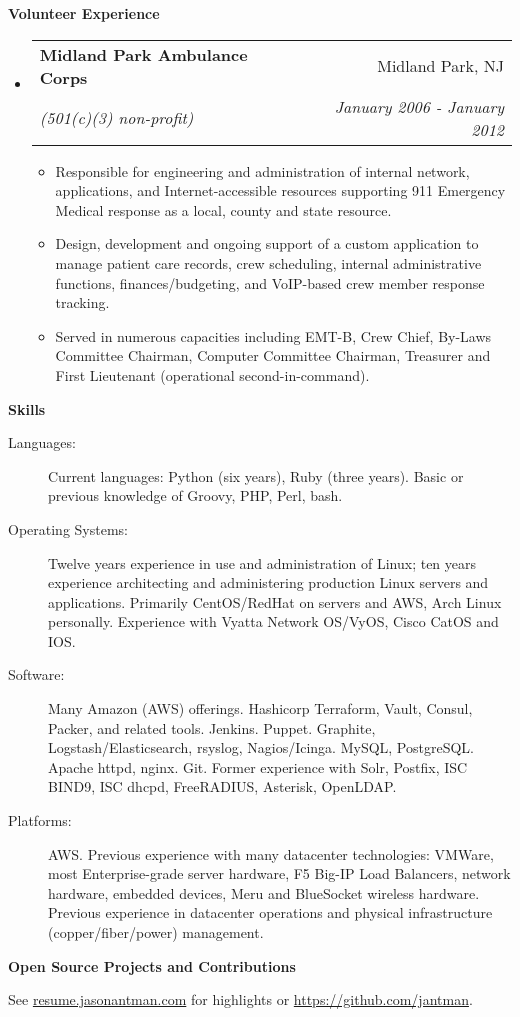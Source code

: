 \documentclass[letterpaper,11pt]{article}
\makeatletter
\newcommand{\resitem}[1]{\item #1 \vspace{-2pt}}
\newcommand{\resheading}[1]{{\large \colorbox{mygrey}{\begin{minipage}{\textwidth}{\textbf{#1 \vphantom{p\^{E}}}}\end{minipage}}}}
\newcommand{\ressubheading}[4]{
\begin{tabular*}{7.0in}{l@{\extracolsep{\fill}}r}
		\textbf{#1} & #2 \\
		\textit{#3} & \textit{#4} \\
\end{tabular*}\vspace{-6pt}}
\makeatother
\begin{document}
\resheading{Volunteer Experience}
\begin{itemize}
\item
        \ressubheading{Midland Park Ambulance Corps}{Midland Park, NJ}{(501(c)(3) non-profit)}{January 2006 - January 2012}
        \begin{itemize}
                \resitem{Responsible for engineering and administration of internal network, applications, and Internet-accessible resources supporting 911 Emergency Medical response as a local, county and state resource.}
                \resitem{Design, development and ongoing support of a custom application to manage patient care records, crew scheduling, internal administrative functions, finances/budgeting, and VoIP-based crew member response tracking.}
                \resitem{Served in numerous capacities including EMT-B, Crew Chief, By-Laws Committee Chairman, Computer Committee Chairman, Treasurer and First Lieutenant (operational second-in-command).}
        \end{itemize}
\end{itemize}

\resheading{Skills}

\begin{description}
\item[Languages:]
Current languages: Python (six years), Ruby (three years). Basic or previous knowledge of Groovy, PHP, Perl, bash.
\item[Operating Systems:]
Twelve years experience in use and administration of Linux; ten years experience architecting and administering production Linux servers and applications.
Primarily CentOS/RedHat on servers and AWS, Arch Linux personally. Experience with Vyatta Network OS/VyOS, Cisco CatOS and IOS.
\item[Software:]
Many Amazon (AWS) offerings. Hashicorp Terraform, Vault, Consul, Packer, and related tools. Jenkins. Puppet. Graphite, Logstash/Elasticsearch, rsyslog, Nagios/Icinga. MySQL, PostgreSQL. Apache httpd, nginx. Git.
Former experience with Solr, Postfix, ISC BIND9, ISC dhcpd, FreeRADIUS, Asterisk, OpenLDAP.

\item[Platforms:]
AWS. Previous experience with many datacenter technologies: VMWare, most Enterprise-grade server hardware, F5 Big-IP Load Balancers, network hardware, embedded devices, Meru and BlueSocket wireless hardware. Previous experience in datacenter operations and physical infrastructure (copper/fiber/power) management.
\end{description}

\resheading{Open Source Projects and Contributions}
\begin{description}
\item{See \href{http://resume.jasonantman.com}{resume.jasonantman.com} for highlights or \href{https://github.com/jantman}{https://github.com/jantman}.}
\end{description}
\end{document}
